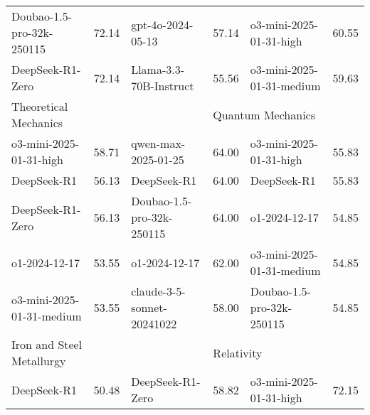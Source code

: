 {\begin{longtable}{p{4.2cm}>{\centering\arraybackslash} p{0.8cm}|p{4.2cm} >{\centering\arraybackslash} p{0.8cm}|p{4.2cm} >{\centering\arraybackslash} p{0.8cm}}
\cellcolor{blue!5} Doubao-1.5-pro-32k-250115 & \cellcolor{blue!2}72.14 & \cellcolor{yellow!5} gpt-4o-2024-05-13 & \cellcolor{yellow!2} 57.14 & \cellcolor{green!5} o3-mini-2025-01-31-high & \cellcolor{green!2} 60.55\\
\cellcolor{blue!5} DeepSeek-R1-Zero & \cellcolor{blue!2}72.14 & \cellcolor{yellow!5} Llama-3.3-70B-Instruct & \cellcolor{yellow!2} 55.56 & \cellcolor{green!5} o3-mini-2025-01-31-medium & \cellcolor{green!2} 59.63\\
\hline
\multicolumn{2}{p{5.15cm}|}{\cellcolor{blue!10} \centering Theoretical Mechanics} & \multicolumn{2}{p{5.15cm}|}{\cellcolor{yellow!10} \centering Nursing and Rehabilitation Medicine} & \multicolumn{2}{p{5.15cm}}{\cellcolor{green!10} \centering Quantum Mechanics}\\
\hline
\cellcolor{blue!5} o3-mini-2025-01-31-high & \cellcolor{blue!2}58.71 & \cellcolor{yellow!5} qwen-max-2025-01-25 & \cellcolor{yellow!2} 64.00 & \cellcolor{green!5} o3-mini-2025-01-31-high & \cellcolor{green!2} 55.83\\
\cellcolor{blue!5} DeepSeek-R1 & \cellcolor{blue!2}56.13 & \cellcolor{yellow!5} DeepSeek-R1 & \cellcolor{yellow!2} 64.00 & \cellcolor{green!5} DeepSeek-R1 & \cellcolor{green!2} 55.83\\
\cellcolor{blue!5} DeepSeek-R1-Zero & \cellcolor{blue!2}56.13 & \cellcolor{yellow!5} Doubao-1.5-pro-32k-250115 & \cellcolor{yellow!2} 64.00 & \cellcolor{green!5} o1-2024-12-17 & \cellcolor{green!2} 54.85\\
\cellcolor{blue!5} o1-2024-12-17 & \cellcolor{blue!2}53.55 & \cellcolor{yellow!5} o1-2024-12-17 & \cellcolor{yellow!2} 62.00 & \cellcolor{green!5} o3-mini-2025-01-31-medium & \cellcolor{green!2} 54.85\\
\cellcolor{blue!5} o3-mini-2025-01-31-medium & \cellcolor{blue!2}53.55 & \cellcolor{yellow!5} claude-3-5-sonnet-20241022 & \cellcolor{yellow!2} 58.00 & \cellcolor{green!5} Doubao-1.5-pro-32k-250115 & \cellcolor{green!2} 54.85\\
\hline
\multicolumn{2}{p{5.15cm}|}{\cellcolor{blue!10} \centering Iron and Steel Metallurgy} & \multicolumn{2}{p{5.15cm}|}{\cellcolor{yellow!10} \centering Obstetrics and Gynecology} & \multicolumn{2}{p{5.15cm}}{\cellcolor{green!10} \centering Relativity}\\
\hline
\cellcolor{blue!5} DeepSeek-R1 & \cellcolor{blue!2}50.48 & \cellcolor{yellow!5} DeepSeek-R1-Zero & \cellcolor{yellow!2} 58.82 & \cellcolor{green!5} o3-mini-2025-01-31-high & \cellcolor{green!2} 72.15\\

\end{longtable}}
